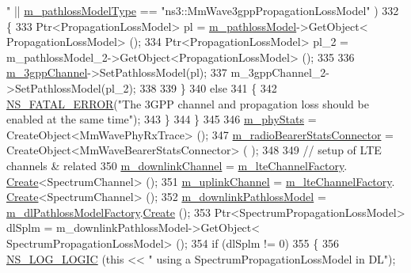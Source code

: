 \begin{DoxyCode}
{      "} || \hyperlink{classns3_1_1MmWaveHelper_a7f17e9bc4797b51d9a31d16c7e667960}{m\_pathlossModelType} == \textcolor{stringliteral}{"ns3::MmWave3gppPropagationLossModel"} )
332                 \{
333                         Ptr<PropagationLossModel> pl = \hyperlink{classns3_1_1MmWaveHelper_a4de60027f5a256fe51033e6d6803e9b0}{m\_pathlossModel}->GetObject<
      PropagationLossModel> ();
334                         Ptr<PropagationLossModel> pl\_2 = m\_pathlossModel\_2->GetObject<PropagationLossModel>
       ();
335 
336                         \hyperlink{classns3_1_1MmWaveHelper_a1cbb083568aa048da48260725e3cf4a4}{m\_3gppChannel}->SetPathlossModel(pl);
337                         m\_3gppChannel\_2->SetPathlossModel(pl\_2);
338 
339                 \}
340                 \textcolor{keywordflow}{else}
341                 \{
342                         \hyperlink{group__fatal_ga5131d5e3f75d7d4cbfd706ac456fdc85}{NS\_FATAL\_ERROR}(\textcolor{stringliteral}{"The 3GPP channel and propagation loss should be
       enabled at the same time"});
343                 \}
344         \}
345 
346         \hyperlink{classns3_1_1MmWaveHelper_ab9d839b6818e194a54630facc19cbb1a}{m\_phyStats} = CreateObject<MmWavePhyRxTrace> ();
347         \hyperlink{classns3_1_1MmWaveHelper_ad5ffe8dabdf448f8b8ccfa2451b04f35}{m\_radioBearerStatsConnector} = CreateObject<MmWaveBearerStatsConnector> (
      );
348 
349         \textcolor{comment}{// setup of LTE channels & related}
350         \hyperlink{classns3_1_1MmWaveHelper_aa8d0ffe634d74e461d22d96afcec0239}{m\_downlinkChannel} = \hyperlink{classns3_1_1MmWaveHelper_a89535a1ab5d394e1796cad39e2a6637e}{m\_lteChannelFactory}.
      \hyperlink{classns3_1_1ObjectFactory_a18152e93f0a6fe184ed7300cb31e9896}{Create}<SpectrumChannel> ();
351         \hyperlink{classns3_1_1MmWaveHelper_a4f2b3aa855c0324fadfd5b174e240a66}{m\_uplinkChannel} = \hyperlink{classns3_1_1MmWaveHelper_a89535a1ab5d394e1796cad39e2a6637e}{m\_lteChannelFactory}.
      \hyperlink{classns3_1_1ObjectFactory_a18152e93f0a6fe184ed7300cb31e9896}{Create}<SpectrumChannel> ();
352         \hyperlink{classns3_1_1MmWaveHelper_aa6554e23ddc0a9bdadb5ea91f85307b0}{m\_downlinkPathlossModel} = 
      \hyperlink{classns3_1_1MmWaveHelper_a7c1e9bc636d68d5d815af16e81be9ccf}{m\_dlPathlossModelFactory}.\hyperlink{classns3_1_1ObjectFactory_a18152e93f0a6fe184ed7300cb31e9896}{Create} ();
353         Ptr<SpectrumPropagationLossModel> dlSplm = m\_downlinkPathlossModel->GetObject<
      SpectrumPropagationLossModel> ();
354         \textcolor{keywordflow}{if} (dlSplm != 0)
355         \{
356           \hyperlink{group__logging_ga88acd260151caf2db9c0fc84997f45ce}{NS\_LOG\_LOGIC} (\textcolor{keyword}{this} << \textcolor{stringliteral}{" using a SpectrumPropagationLossModel in DL"});

\end{DoxyCode}
